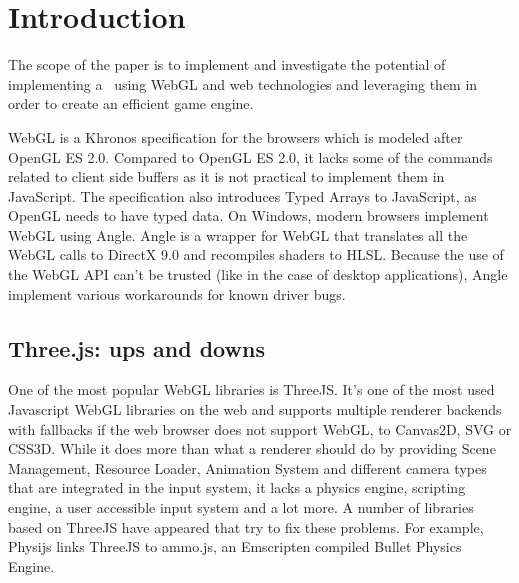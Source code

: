 \chapter{Introduction}
\label{chapter:intro}


The scope of the paper is to implement and investigate the potential of implementing a
\project\ using WebGL and web technologies and leveraging them in order to create an efficient game engine.

WebGL is a Khronos specification for the browsers which is modeled after OpenGL ES 2.0. Compared to OpenGL ES 2.0, it lacks some of the commands related to client side buffers as it is not practical to implement them in JavaScript. The specification also introduces Typed Arrays to JavaScript, as OpenGL needs to have typed data. On Windows, modern browsers implement WebGL using Angle. Angle is a wrapper for WebGL that translates all the WebGL calls to DirectX 9.0 and recompiles shaders to HLSL. Because the use of the WebGL API can't be trusted (like in the case of desktop applications), Angle implement various workarounds for known driver bugs.



\section{Three.js: ups and downs}
\label{sec: ThreeJs}

One of the most popular WebGL libraries is ThreeJS. It’s one of the most used Javascript WebGL libraries on the web and supports multiple renderer backends with fallbacks if the web browser does not support WebGL, to Canvas2D, SVG or CSS3D. 
While it does more than what a renderer should do by providing Scene Management,
Resource Loader, Animation System and different camera types that are integrated in the
input system, it lacks a physics engine, scripting engine, a user accessible input system and a lot more.
A number of libraries based on ThreeJS have appeared that try to fix these problems. For example, Physijs links ThreeJS to ammo.js, an Emscripten compiled Bullet Physics Engine.


